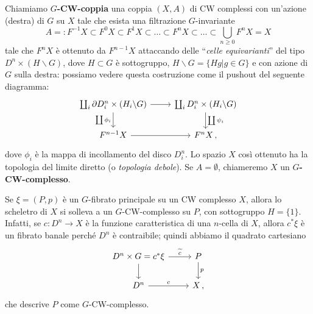 \begin{df}
	Chiamiamo \textbf{$G$-CW-coppia} una coppia $(X,A)$ di CW complessi
	con un'azione (destra) di $G$ su $X$ tale che esista una filtrazione $G$-invariante
	\begin{equation*}
		A =: F^{-1}X \subset F^{0}X \subset F^{1}X \subset \dots  
		\subset F^{n}X \subset \dots
		\subset \bigcup_{n \ge 0} F^{n}X = X
	\end{equation*}
	tale che $F^{n}X$ è ottenuto da $F^{n-1}X$ attaccando delle ``\emph{celle equivarianti}'' 
	del tipo
		$D^{n} \times \left( H \backslash G \right)$,
	dove $H \subset G$ è sottogruppo, $H \backslash G = \{Hg | g \in G\}$
	e con azione di $G$ sulla destra:
	possiamo vedere questa costruzione come il pushout del seguente diagramma:
	\begin{equation*}
	 	\begin{tikzcd}
	 		\coprod_{i} \de D_{i}^{n} \times \left( H_{i} \backslash G \right) 
	 		\ar[r] \ar[d, "\coprod \phi_{i}"'] 
	 		& \coprod_{i} D_{i}^{n} \times \left( H_{i} \backslash G \right) 
	 		\ar[d, "\coprod \psi_{i}"]  \\
	 		F^{n-1}X \ar[r] & F^{n}X\,,
	 	\end{tikzcd}
	 \end{equation*}
	 dove $\phi_{i}$ è la mappa di incollamento del disco $D^{n}_{i}$.
	 Lo spazio $X$ così ottenuto ha la topologia del limite diretto (o \emph{topologia debole}). 
	 Se $A=\emptyset$, chiameremo $X$ un \textbf{$G$-CW-complesso}.
\end{df}


\begin{oss}
	Se $\xi=(P,p)$ è un $G$-fibrato principale su un CW complesso $X$,
	allora lo scheletro di $X$ si solleva a un $G$-CW-complesso su $P$,
	con sottogruppo $H=\{1\}$.
	Infatti, se $c:D^{n} \to X$ è la funzione caratteristica di una $n$-cella di $X$,
	allora $c^{*}\xi$ è un fibrato banale perché $D^{n}$ è contraibile;
	quindi abbiamo il quadrato cartesiano
	\begin{equation*}
		\begin{tikzcd}
		D^{n} \times G = c^{*}\xi \ar[r, "\widetilde{c}"] \ar[d]
		& P \ar[d, "p"] \\
		D^{n} \ar[r, "c"] & X\,,
		\end{tikzcd}
	\end{equation*}
	che descrive $P$ come $G$-CW-complesso.
\end{oss}

